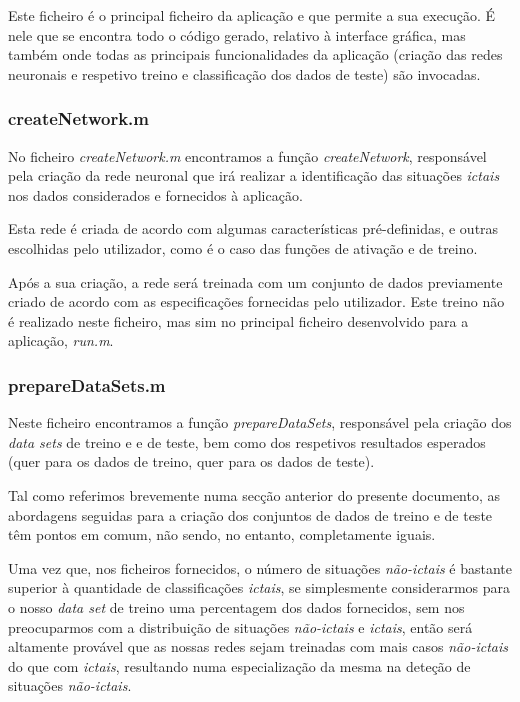 \documentclass{article}
\begin{document}
Este ficheiro é o principal ficheiro da aplicação e que permite a sua execução. É nele que se encontra todo o código gerado, relativo à interface gráfica, mas também onde todas as principais funcionalidades da aplicação (criação das redes neuronais e respetivo treino e classificação dos dados de teste) são invocadas.

\subsubsection{createNetwork.m}

No ficheiro \emph{createNetwork.m} encontramos a função \emph{createNetwork}, responsável pela criação da rede neuronal que irá realizar a identificação das  situações \emph{ictais} nos dados considerados e fornecidos à aplicação. 

Esta rede é criada de acordo com algumas características pré-definidas, e outras escolhidas pelo utilizador, como é o caso das funções de ativação e de treino.

Após a sua criação, a rede será treinada com um conjunto de dados previamente criado de acordo com as especificações fornecidas pelo utilizador. Este treino não é realizado neste ficheiro, mas sim no principal ficheiro desenvolvido para a aplicação, \emph{run.m}.

\subsubsection{prepareDataSets.m}

Neste ficheiro encontramos a função \emph{prepareDataSets}, responsável pela criação dos \emph{data sets} de treino e e de teste, bem como dos respetivos resultados esperados (quer para os dados de treino, quer para os dados de teste).

Tal como referimos brevemente numa secção anterior do presente documento, as abordagens seguidas para a criação dos conjuntos de dados de treino e de teste têm pontos em comum, não sendo, no entanto, completamente iguais.

Uma vez que, nos ficheiros fornecidos, o número de situações \emph{não-ictais} é bastante superior à quantidade de classificações \emph{ictais}, se simplesmente considerarmos para o nosso \emph{data set} de treino uma percentagem dos dados fornecidos, sem nos preocuparmos com a distribuição de situações \emph{não-ictais} e \emph{ictais}, então será altamente provável que as nossas redes sejam treinadas com mais casos \emph{não-ictais} do que com \emph{ictais}, resultando numa especialização da mesma na deteção de situações \emph{não-ictais}.
\end{document}
